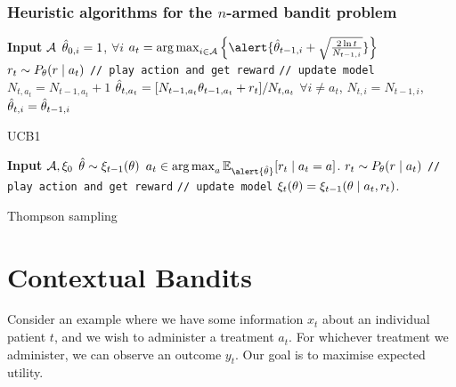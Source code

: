 \documentclass[9pt]{beamer}
\begin{document}
\begin{frame}
  \frametitle{Heuristic algorithms for the $n$-armed bandit problem}
  \begin{algorithm}[H]
    \begin{algorithmic}
      \State \textbf{Input} ${\mathcal{A}}$
      \State $\hat{\theta}_{0,i} = 1$, $\forall i$
      \State $a_t = \argmax_{i \in \CA} \left\{\alert{\hat{\param}_{{t-1},i} + \sqrt{\frac{2\ln t}{N_{t-1,i}}}}\right\}$
      \State $r_t \sim P_\theta(r \mid a_t)$ \texttt{// play action and get reward}
      \texttt{// update model}
      \State $N_{t,a_t} = N_{t-1,a_t} + 1$
      \State $\hat{\theta}_{t,a_t} = [N_{t-1, a_t} \theta_{t-1, a_t} + r_t]/N_{t, a_t}$
      \State $\forall i \neq a_t$, $N_{t,i} = N_{t-1,i}$, $\hat{\theta}_{t,i} = \hat{\theta}_{t-1,i}$
      \EndFor
    \end{algorithmic}
    \caption{UCB1}
  \end{algorithm}

  \begin{algorithm}[H]
    \begin{algorithmic}
      \State \textbf{Input} ${\mathcal{A}}, \xi_0$
      \State \alert{$\hat{\theta} \sim \xi_{t-1}(\theta)$}
      \State $a_t \in \argmax_{a} \E_{\alert{\hat{\param}}} [r_t \mid a_t = a]$.
      \State $r_t \sim P_\theta(r \mid a_t)$ \texttt{// play action and get reward}
      \texttt{// update model}
      \State $\xi_t(\theta) = \xi_{t-1}(\theta \mid a_t, r_t)$.
      \EndFor
    \end{algorithmic}
    \caption{Thompson sampling}
  \end{algorithm}

\end{frame}

\section{Contextual Bandits}


\begin{frame}
  \begin{example}
    Consider an example where we have some information $x_t$ about an
    individual patient $t$, and we wish to administer a treatment
    $a_t$. For whichever treatment we administer, we can observe an
    outcome $y_t$. Our goal is to maximise expected utility.
  \end{example}
\end{frame}
\end{document}
